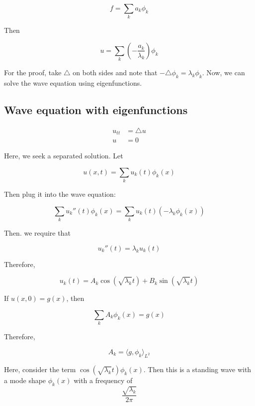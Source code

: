 \documentclass{article}
\newtheorem{one minute paper}[theorem]{One Minute Paper}
\begin{document}
\begin{equation}
    f = \sum_k a_k \phi_k
\end{equation}

Then 

\begin{equation}
    u = \sum_k \left( -\frac{a_k}{\lambda_k} \right)\phi_k
\end{equation}

For the proof, take $\triangle$ on both sides and note that $-\triangle \phi_k = \lambda_k \phi_k$. Now, we can solve the wave equation using eigenfunctions. 

\subsection*{Wave equation with eigenfunctions}

\begin{align*}
    u_{tt} &= \triangle u \\
    u &= 0 
\end{align*}

Here, we seek a separated solution. Let 

\begin{equation}
    u(x,t) = \sum_k u_k(t)\phi_k(x)
\end{equation}

Then plug it into the wave equation:

\begin{equation}
    \sum_k u_k''(t)\phi_k(x) = \sum_k u_k(t)(-\lambda_k \phi_k(x))
\end{equation}

Then. we require that 

\begin{equation}
    u_k''(t) = \lambda_k u_k(t)
\end{equation}

Therefore, 

\begin{equation}
    u_k(t) = A_k\cos(\sqrt{\lambda_k}t) + B_k \sin(\sqrt{\lambda_k}t)
\end{equation}

If $u(x,0) = g(x)$, then 

\begin{equation}
    \sum_k A_k \phi_k(x) = g(x)
\end{equation}

Therefore, 

\begin{equation}
    A_k = \langle g, \phi_k \rangle_{L^2}
\end{equation}

Here, consider the term $\cos(\sqrt{\lambda_k} t)\phi_k(x)$. Then this is a standing wave with a mode shape $\phi_k(x)$ with a frequency of $$\frac{\sqrt{\lambda_k}}{2\pi}$$
\end{document}
